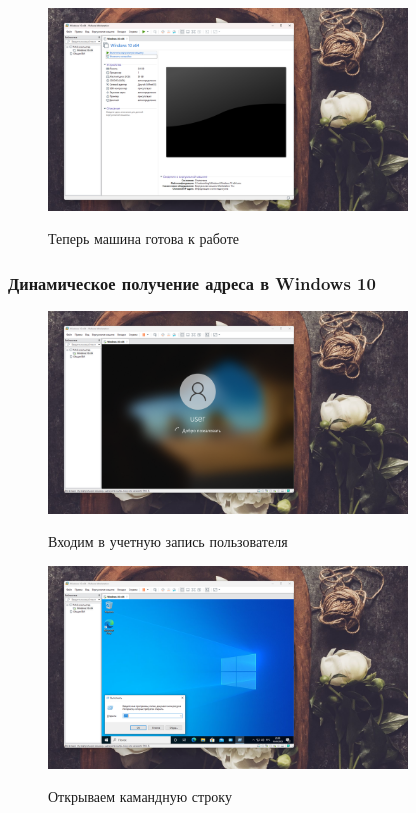 \documentclass[a4paper]{article}
\begin{document}
  \begin{figure}[H]
    \centering
    \includegraphics[width=0.85\textwidth]{06_00 (12)}
    \label{img:12}
    \caption{Теперь машина готова к работе}
  \end{figure}
  
  \subsubsection{Динамическое получение адреса в Windows 10}

  \begin{figure}[H]
    \centering
    \includegraphics[width=0.85\textwidth]{06_00 (13)}
    \label{img:13}
    \caption{Входим в учетную запись пользователя}
  \end{figure}
  
  \begin{figure}[H]
    \centering
    \includegraphics[width=0.85\textwidth]{06_00 (14)}
    \label{img:14}
    \caption{Открываем камандную строку}
  \end{figure}
  
\end{document}
